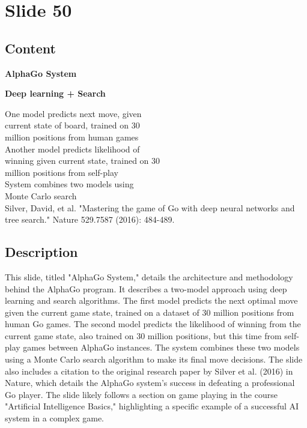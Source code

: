 \documentclass{article}%
\begin{document}
%
\newpage%
\section{Slide 50}%
\label{sec:Slide50}%
\subsection{Content}%

\textbf{AlphaGo System}

\textbf{Deep learning + Search}

One model predicts next move, given \\
current state of board, trained on 30 \\
million positions from human games \\

Another model predicts likelihood of \\
winning given current state, trained on 30 \\
million positions from self-play \\

System combines two models using \\
Monte Carlo search \\

Silver, David, et al. "Mastering the game of Go with deep neural networks and tree search." Nature 529.7587 (2016): 484-489.
%
\subsection{Description}%
This slide, titled "AlphaGo System," details the architecture and methodology behind the AlphaGo program.  It describes a two-model approach using deep learning and search algorithms.  The first model predicts the next optimal move given the current game state, trained on a dataset of 30 million positions from human Go games. The second model predicts the likelihood of winning from the current game state, also trained on 30 million positions, but this time from self-play games between AlphaGo instances.  The system combines these two models using a Monte Carlo search algorithm to make its final move decisions.  The slide also includes a citation to the original research paper by Silver et al. (2016) in Nature, which details the AlphaGo system's success in defeating a professional Go player.  The slide likely follows a section on game playing in the course "Artificial Intelligence Basics," highlighting a specific example of a successful AI system in a complex game.%
\end{document}
